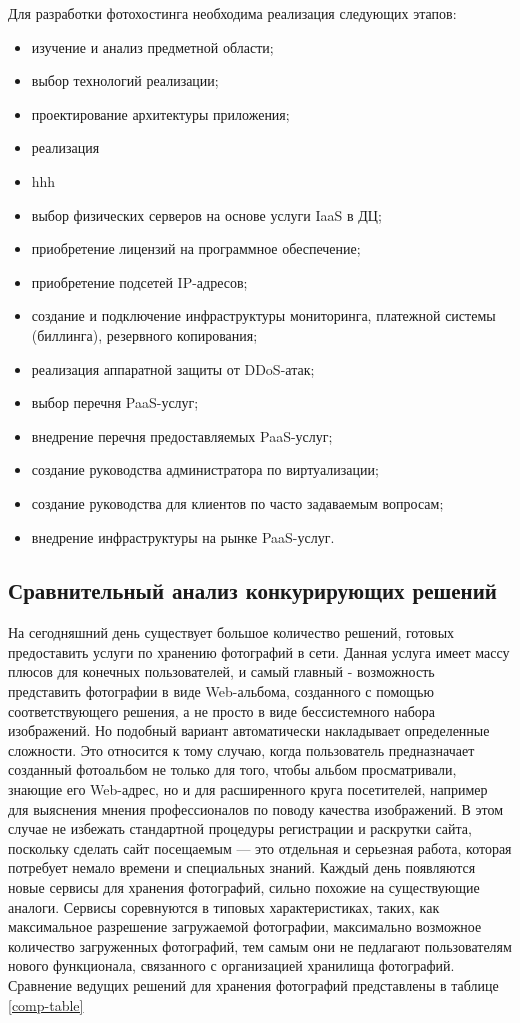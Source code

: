 Для разработки фотохостинга необходима реализация следующих этапов:
\begin{itemize}
    \item изучение и анализ предметной области;
    \item выбор технологий реализации;
    \item проектирование архитектуры приложения;
    \item реализация 
    \item hhh
    \item выбор физических серверов на основе услуги IaaS в ДЦ;
    \item приобретение лицензий на программное обеспечение;
    \item приобретение подсетей IP-адресов;
    \item создание и подключение инфраструктуры мониторинга, платежной системы (биллинга), резервного копирования;
    \item реализация аппаратной защиты от DDoS-атак;
    \item выбор перечня PaaS-услуг;
    \item внедрение перечня предоставляемых PaaS-услуг;
    \item создание руководства администратора по виртуализации;
    \item создание руководства для клиентов по часто задаваемым вопросам;
    \item внедрение инфраструктуры на рынке PaaS-услуг.
\end{itemize}

\subsection{Сравнительный анализ конкурирующих решений} \label{comparsion}

На сегодняшний день существует большое количество решений, готовых предоставить услуги по хранению фотографий в сети.
Данная услуга имеет массу плюсов для конечных пользователей, и самый главный  - возможность представить фотографии в виде Web-альбома, созданного с помощью соответствующего решения, а не просто в виде бессистемного набора изображений.
Но подобный вариант автоматически накладывает определенные сложности. 
Это относится к тому случаю, когда пользователь предназначает созданный фотоальбом не только для того, чтобы альбом просматривали, знающие его Web-адрес, но и для расширенного круга посетителей, например для выяснения мнения профессионалов по поводу качества изображений.
В этом случае не избежать стандартной процедуры регистрации и раскрутки сайта, поскольку сделать сайт посещаемым — это отдельная и серьезная работа, которая потребует немало времени и специальных знаний.
Каждый день появляются новые сервисы для хранения фотографий, сильно похожие на существующие аналоги.
Сервисы соревнуются в типовых характеристиках, таких, как максимальное разрешение загружаемой фотографии, максимально возможное количество загруженных фотографий, тем самым они не педлагают пользователям нового функционала, связанного с организацией хранилища фотографий.
Сравнение ведущих решений для хранения фотографий представлены в таблице \ref{comp-table}

